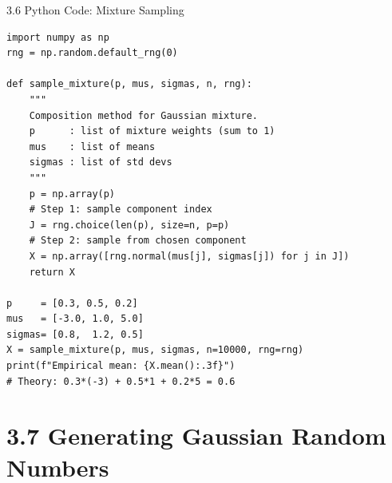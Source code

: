 \documentclass[aspectratio=169,10pt]{beamer}
\begin{document}
\begin{frame}[fragile]{3.6 Python Code: Mixture Sampling}
  \begin{lstlisting}[style=python, caption={Composition method for Gaussian mixture}]
import numpy as np
rng = np.random.default_rng(0)

def sample_mixture(p, mus, sigmas, n, rng):
    """
    Composition method for Gaussian mixture.
    p      : list of mixture weights (sum to 1)
    mus    : list of means
    sigmas : list of std devs
    """
    p = np.array(p)
    # Step 1: sample component index
    J = rng.choice(len(p), size=n, p=p)
    # Step 2: sample from chosen component
    X = np.array([rng.normal(mus[j], sigmas[j]) for j in J])
    return X

p     = [0.3, 0.5, 0.2]
mus   = [-3.0, 1.0, 5.0]
sigmas= [0.8,  1.2, 0.5]
X = sample_mixture(p, mus, sigmas, n=10000, rng=rng)
print(f"Empirical mean: {X.mean():.3f}")
# Theory: 0.3*(-3) + 0.5*1 + 0.2*5 = 0.6
  \end{lstlisting}
\end{frame}

\section{3.7 Generating Gaussian Random Numbers}
\end{document}
